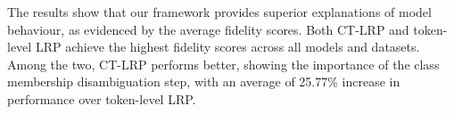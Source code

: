 
The results show that our framework provides superior explanations of model behaviour, as evidenced by the average fidelity scores. Both CT-LRP and token-level LRP achieve the highest fidelity scores across all models and datasets. Among the two, CT-LRP performs better, showing the importance of the class membership disambiguation step, with an average of 25.77\% increase in performance over token-level LRP.





